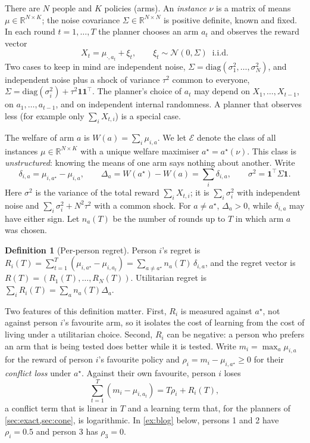 \documentclass[11pt,a4paper]{article}
\theoremstyle{plain}
\theoremstyle{definition}
\newtheorem{definition}[theorem]{Definition}
\theoremstyle{remark}
\newcommand{\R}{\mathbb{R}}
\newcommand{\astar}{a^\star}
\newcommand{\Env}{\mathcal{E}}
\begin{document}
There are $N$ people and $K$ policies (arms). An \emph{instance} $\nu$ is a matrix of means $\mu\in\R^{N\times K}$; the noise covariance $\Sigma\in\R^{N\times N}$ is positive definite, known and fixed. In each round $t=1,\dots,T$ the planner chooses an arm $a_t$ and observes the reward vector
\[
  X_t=\mu_{\cdot,a_t}+\xi_t,\qquad \xi_t\sim\mathcal N(0,\Sigma)\ \text{ i.i.d.}
\]
Two cases to keep in mind are independent noise, $\Sigma=\mathrm{diag}(\sigma_1^2,\dots,\sigma_N^2)$, and independent noise plus a shock of variance $\tau^2$ common to everyone, $\Sigma=\mathrm{diag}(\sigma_i^2)+\tau^2\mathbf 1\mathbf 1^\top$. The planner's choice of $a_t$ may depend on $X_1,\dots,X_{t-1}$, on $a_1,\dots,a_{t-1}$, and on independent internal randomness. A planner that observes less (for example only $\sum_iX_{t,i}$) is a special case.

The welfare of arm $a$ is $W(a)=\sum_i\mu_{i,a}$. We let $\Env$ denote the class of all instances $\mu\in\R^{N\times K}$ with a unique welfare maximiser $\astar=\astar(\nu)$. This class is \emph{unstructured}: knowing the means of one arm says nothing about another. Write
\[
  \delta_{i,a}=\mu_{i,\astar}-\mu_{i,a},\qquad \Delta_a=W(\astar)-W(a)=\sum_i\delta_{i,a},\qquad \sigma^2=\mathbf 1^\top\Sigma\mathbf 1 .
\]
Here $\sigma^2$ is the variance of the total reward $\sum_iX_{t,i}$; it is $\sum_i\sigma_i^2$ with independent noise and $\sum_i\sigma_i^2+N^2\tau^2$ with a common shock. For $a\neq\astar$, $\Delta_a>0$, while $\delta_{i,a}$ may have either sign. Let $n_a(T)$ be the number of rounds up to $T$ in which arm $a$ was chosen.

\begin{definition}[Per-person regret]
Person $i$'s regret is $R_i(T)=\sum_{t=1}^T(\mu_{i,\astar}-\mu_{i,a_t})=\sum_{a\neq\astar}n_a(T)\,\delta_{i,a}$, and the regret vector is $R(T)=(R_1(T),\dots,R_N(T))$. Utilitarian regret is $\sum_iR_i(T)=\sum_{a}n_a(T)\Delta_a$.
\end{definition}

Two features of this definition matter. First, $R_i$ is measured against $\astar$, not against person $i$'s favourite arm, so it isolates the cost of learning from the cost of living under a utilitarian choice. Second, $R_i$ can be negative: a person who prefers an arm that is being tested does better while it is tested. Write $m_i=\max_a\mu_{i,a}$ for the reward of person $i$'s favourite policy and $\rho_i=m_i-\mu_{i,\astar}\ge0$ for their \emph{conflict loss} under $\astar$. Against their own favourite, person $i$ loses
\begin{equation}\label{eq:decomp}
  \sum_{t=1}^T(m_i-\mu_{i,a_t})=T\rho_i+R_i(T),
\end{equation}
a conflict term that is linear in $T$ and a learning term that, for the planners of \cref{sec:exact,sec:cone}, is logarithmic. In \cref{ex:blog} below, persons 1 and 2 have $\rho_i=0.5$ and person 3 has $\rho_3=0$.
\end{document}
